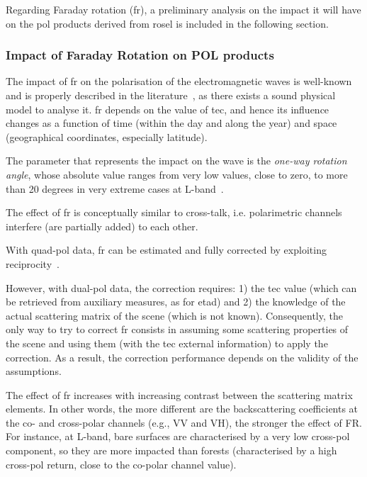 
Regarding Faraday rotation (\acs{fr}), a preliminary analysis on the impact it will have on the \acs{pol} products derived from \acs{rosel} is included in the following section.

\subsubsection{Impact of Faraday Rotation on POL products}
\label{sec:pol_fr}


The impact of \acs{fr} on the polarisation of the electromagnetic waves is well-known and is properly described in the literature~\citep{Wright2003,Freeman2004a,Freeman2004b}, as there exists a sound physical model to analyse it. \acs{fr} depends on the value of \acs{tec}, and hence its influence changes as a function of time (within the day and along the year) and space (geographical coordinates, especially latitude). 

The parameter that represents the impact on the wave is the \emph{one-way rotation angle}, whose absolute value ranges from very low values, close to zero, to more than 20 degrees in very extreme cases at L-band~\citep{Meyer2008}. 

The effect of \acs{fr} is conceptually similar to cross-talk, i.e. polarimetric channels interfere (are partially added) to each other.

With quad-pol data, \acs{fr} can be estimated and fully corrected by exploiting reciprocity~\citep{Bickle1965,Wright2003,Freeman2004b,Meyer2008}.

However, with dual-pol data, the correction requires: 1) the \acs{tec} value (which can be retrieved from auxiliary measures, as for \acs{etad}) and 2) the knowledge of the actual scattering matrix of the scene (which is not known). Consequently, the only way to try to correct \acs{fr} consists in assuming some scattering properties of the scene and using them (with the \acs{tec} external information) to apply the correction. As a result, the correction performance depends on the validity of the assumptions.

The effect of \acs{fr} increases with increasing contrast between the scattering matrix elements. In other words, the more different are the backscattering coefficients at the co- and cross-polar channels (e.g., VV and VH), the stronger the effect of FR. For instance, at L-band, bare surfaces are characterised by a very low cross-pol component, so they are more impacted than forests (characterised by a high cross-pol return, close to the co-polar channel value).

